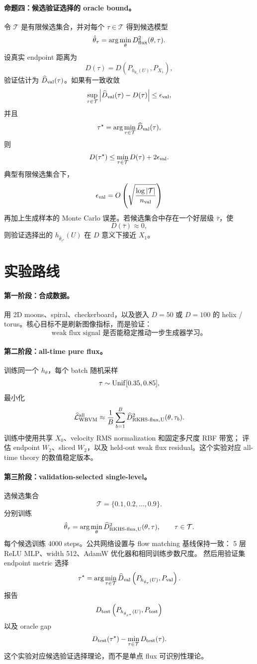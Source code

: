 \documentclass[UTF8,11pt]{ctexart}
\newcommand{\cL}{\mathcal{L}}
\begin{document}
\paragraph{命题四：候选验证选择的 oracle bound。}
令 \(\mathcal T\) 是有限候选集合，并对每个 \(\tau\in\mathcal T\) 得到候选模型
\[
\hat\theta_\tau
=
\arg\min_\theta
D_{\rm flux}^2(\theta,\tau).
\]
设真实 endpoint 距离为
\[
D(\tau)
=
D\left(P_{h_{\hat\theta_\tau}(U)},P_{X_1}\right),
\]
验证估计为 \(\widehat D_{\rm val}(\tau)\)。如果有一致收敛
\[
\sup_{\tau\in\mathcal T}
\left|
\widehat D_{\rm val}(\tau)-D(\tau)
\right|
\le
\epsilon_{\rm val},
\]
并且
\[
\tau^\star
=
\arg\min_{\tau\in\mathcal T}\widehat D_{\rm val}(\tau),
\]
则
\[
D(\tau^\star)
\le
\min_{\tau\in\mathcal T}D(\tau)
+
2\epsilon_{\rm val}.
\]
典型有限候选集合下，
\[
\epsilon_{\rm val}
=
O\left(
\sqrt{\frac{\log|\mathcal T|}{n_{\rm val}}}
\right)
\]
再加上生成样本的 Monte Carlo 误差。若候选集合中存在一个好层级 \(\bar\tau\)，使
\[
D(\bar\tau)\approx 0,
\]
则验证选择出的 \(h_{\hat\theta_{\tau^\star}}(U)\) 在 \(D\) 意义下接近 \(X_1\)。

\section{实验路线}

\paragraph{第一阶段：合成数据。}
用 2D moons、spiral、checkerboard，以及嵌入 \(D=50\) 或 \(D=100\) 的 helix / torus。核心目标不是刷新图像指标，而是验证：
\[
\text{weak flux signal 是否能稳定推动一步生成器学习。}
\]

\paragraph{第二阶段：all-time pure flux。}
训练同一个 \(h_\theta\)，每个 batch 随机采样
\[
\tau\sim{\rm Unif}[0.35,0.85],
\]
最小化
\[
\widehat{\cL}_{\rm WBVM}^{\rm all}
\approx
\frac1B\sum_{b=1}^B
\widehat D_{\rm RKHS\text{-}flux,U}^2(\theta,\tau_b).
\]
训练中使用共享 \(X_0\)、velocity RMS normalization 和固定多尺度 RBF 带宽；
评估 endpoint \(W_2\)、sliced \(W_2\)，以及 held-out weak flux residual。这个实验对应 all-time theory 的数值稳定版本。

\paragraph{第三阶段：validation-selected single-level。}
选候选集合
\[
\mathcal T=\{0.1,0.2,\ldots,0.9\}.
\]
分别训练
\[
\hat\theta_\tau
=
\arg\min_\theta \widehat D_{\rm RKHS\text{-}flux,U}^2(\theta,\tau),
\qquad \tau\in\mathcal T.
\]
每个候选训练 4000 steps。公共网络设置与 flow matching 基线保持一致：
5 层 ReLU MLP、width 512、AdamW 优化器和相同训练步数尺度。
然后用验证集 endpoint metric 选择
\[
\tau^\star
=
\arg\min_{\tau\in\mathcal T}
\widehat D_{\rm val}
\left(
P_{h_{\hat\theta_\tau}(U)},P_{\rm val}
\right).
\]
报告
\[
D_{\rm test}
\left(
P_{h_{\hat\theta_{\tau^\star}}(U)},P_{\rm test}
\right)
\]
以及 oracle gap
\[
D_{\rm test}(\tau^\star)
-
\min_{\tau\in\mathcal T}D_{\rm test}(\tau).
\]
这个实验对应候选验证选择理论，而不是单点 flux 可识别性理论。
\end{document}
